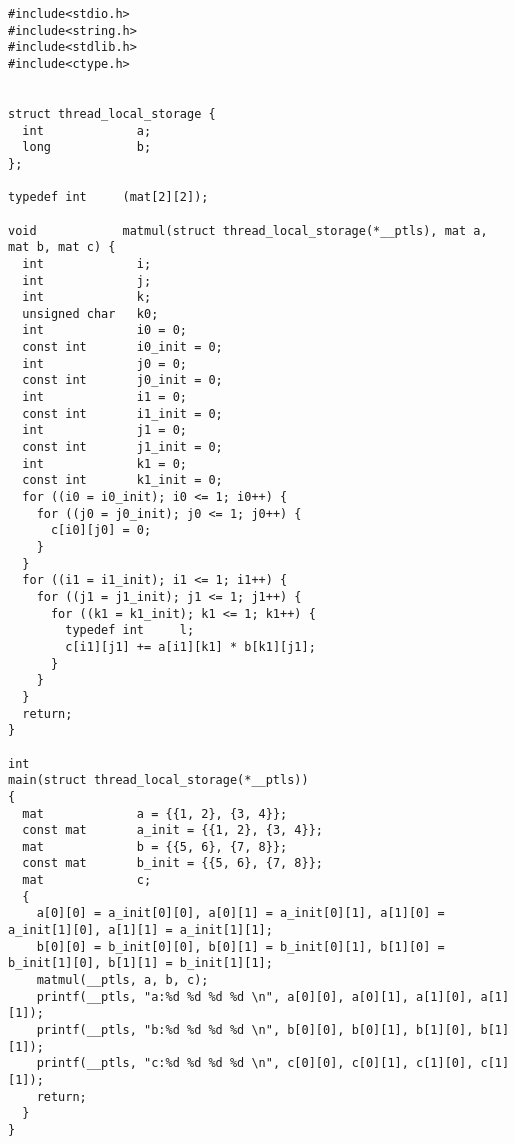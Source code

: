  \begin{verbatim}
#include<stdio.h>
#include<string.h>
#include<stdlib.h>
#include<ctype.h>


struct thread_local_storage {
  int             a;
  long            b;
};

typedef int     (mat[2][2]);

void            matmul(struct thread_local_storage(*__ptls), mat a, mat b, mat c) {
  int             i;
  int             j;
  int             k;
  unsigned char   k0;
  int             i0 = 0;
  const int       i0_init = 0;
  int             j0 = 0;
  const int       j0_init = 0;
  int             i1 = 0;
  const int       i1_init = 0;
  int             j1 = 0;
  const int       j1_init = 0;
  int             k1 = 0;
  const int       k1_init = 0;
  for ((i0 = i0_init); i0 <= 1; i0++) {
    for ((j0 = j0_init); j0 <= 1; j0++) {
      c[i0][j0] = 0;
    }
  }
  for ((i1 = i1_init); i1 <= 1; i1++) {
    for ((j1 = j1_init); j1 <= 1; j1++) {
      for ((k1 = k1_init); k1 <= 1; k1++) {
        typedef int     l;
        c[i1][j1] += a[i1][k1] * b[k1][j1];
      }
    }
  }
  return;
}

int 
main(struct thread_local_storage(*__ptls))
{
  mat             a = {{1, 2}, {3, 4}};
  const mat       a_init = {{1, 2}, {3, 4}};
  mat             b = {{5, 6}, {7, 8}};
  const mat       b_init = {{5, 6}, {7, 8}};
  mat             c;
  {
    a[0][0] = a_init[0][0], a[0][1] = a_init[0][1], a[1][0] = a_init[1][0], a[1][1] = a_init[1][1];
    b[0][0] = b_init[0][0], b[0][1] = b_init[0][1], b[1][0] = b_init[1][0], b[1][1] = b_init[1][1];
    matmul(__ptls, a, b, c);
    printf(__ptls, "a:%d %d %d %d \n", a[0][0], a[0][1], a[1][0], a[1][1]);
    printf(__ptls, "b:%d %d %d %d \n", b[0][0], b[0][1], b[1][0], b[1][1]);
    printf(__ptls, "c:%d %d %d %d \n", c[0][0], c[0][1], c[1][0], c[1][1]);
    return;
  }
}
\end{verbatim} 
